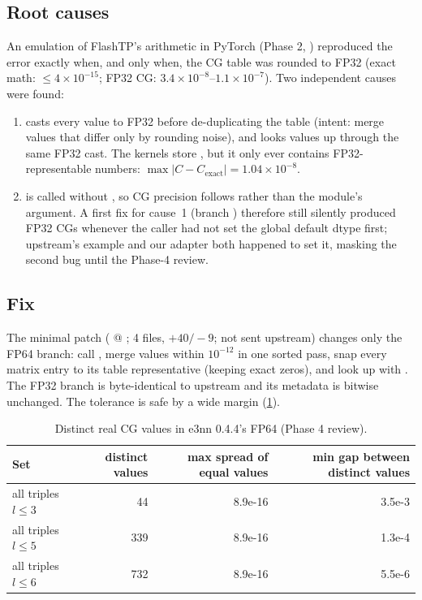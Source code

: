\subsection{Root causes}
An emulation of FlashTP's arithmetic in PyTorch (Phase 2, ) reproduced the error exactly when, and only when, the CG table was rounded to FP32 (exact math: $\le4\times10^{-15}$; FP32 CG: $3.4\times10^{-8}$--$1.1\times10^{-7}$). Two independent causes were found:
\begin{enumerate}
  \item {} casts every  value to FP32 before de-duplicating the table (intent: merge values that differ only by rounding noise), and  looks values up through the same FP32 cast. The kernels store , but it only ever contains FP32-representable numbers: $\max|C-C_{\text{exact}}|=1.04\times10^{-8}$.
  \item {} is called without , so CG precision follows  rather than the module's  argument. A first fix for cause~1 (branch ) therefore still silently produced FP32 CGs whenever the caller had not set the global default dtype first; upstream's example and our adapter both happened to set it, masking the second bug until the Phase-4 review.
\end{enumerate}

\subsection{Fix}
The minimal patch ( @ ; 4 files, $+40/-9$; not sent upstream) changes only the FP64 branch: call , merge values within $10^{-12}$ in one sorted pass, snap every matrix entry to its table representative (keeping exact zeros), and look up with . The FP32 branch is byte-identical to upstream and its metadata is bitwise unchanged. The tolerance is safe by a wide margin (\cref{tab:cgtol}).

\begin{table}[h]
\centering
\caption{Distinct real CG values in e3nn 0.4.4's FP64  (Phase 4 review).}
\label{tab:cgtol}
\small
\begin{tabular}{lrrr}
\toprule
Set & distinct values & max spread of equal values & min gap between distinct values \\
\midrule
all triples $l\le3$ & 44 & 8.9e-16 & 3.5e-3 \\
all triples $l\le5$ & 339 & 8.9e-16 & 1.3e-4 \\
all triples $l\le6$ & 732 & 8.9e-16 & 5.5e-6 \\
\bottomrule
\end{tabular}
\end{table}

